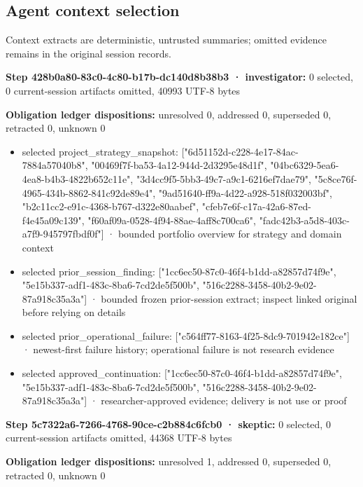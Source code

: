 \documentclass[11pt]{article}
\begin{document}
\subsection{Agent context selection}
Context extracts are deterministic, untrusted summaries; omitted evidence remains in the original session records.\par
\textbf{Step 428b0a80-83c0-4c80-b17b-dc140d8b38b3 · investigator:} 0 selected, 0 current-session artifacts omitted, 40993 UTF-8 bytes\par
\textbf{Obligation ledger dispositions:} unresolved 0, addressed 0, superseded 0, retracted 0, unknown 0\par
\begin{itemize}
\item selected project\_strategy\_snapshot: ["6d51152d-c228-4e17-84ac-7884a57040b8", "00469f7f-ba53-4a12-944d-2d3295e48d1f", "04bc6329-5ea6-4ea8-b4b3-4822b652c11e", "3d4cc9f5-5bb3-49c7-a9c1-6216ef7dae79", "5c8ce76f-4965-434b-8862-841c92de89e4", "9ad51640-ff9a-4d22-a928-518f032003bf", "b2c11cc2-e91c-4368-b767-d322e80aabef", "cfeb7e6f-c17a-42a6-87ed-f4e45a09c139", "f60af09a-0528-4f94-88ae-4aff8c700ca6", "fadc42b3-a5d8-403c-a7f9-945797fbdf0f"] · bounded portfolio overview for strategy and domain context
\item selected prior\_session\_finding: ["1cc6ec50-87c0-46f4-b1dd-a82857d74f9e", "5e15b337-adf1-483c-8ba6-7cd2de5f500b", "516c2288-3458-40b2-9e02-87a918c35a3a"] · bounded frozen prior-session extract; inspect linked original before relying on details
\item selected prior\_operational\_failure: ["c564ff77-8163-4f25-8dc9-701942e182ce"] · newest-first failure history; operational failure is not research evidence
\item selected approved\_continuation: ["1cc6ec50-87c0-46f4-b1dd-a82857d74f9e", "5e15b337-adf1-483c-8ba6-7cd2de5f500b", "516c2288-3458-40b2-9e02-87a918c35a3a"] · researcher-approved evidence; delivery is not use or proof
\end{itemize}
\textbf{Step 5c7322a6-7266-4768-90ce-c2b884c6fcb0 · skeptic:} 0 selected, 0 current-session artifacts omitted, 44368 UTF-8 bytes\par
\textbf{Obligation ledger dispositions:} unresolved 1, addressed 0, superseded 0, retracted 0, unknown 0\par
\end{document}
